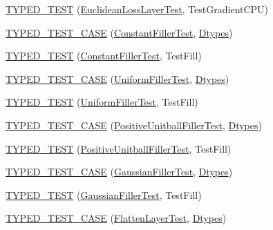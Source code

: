 \begin{DoxyCompactItemize}
\item 
\hyperlink{namespacecaffe_a94529f31fa82dfad9e0ca72b4fddefb7}{T\+Y\+P\+E\+D\+\_\+\+T\+E\+S\+T} (\hyperlink{classcaffe_1_1_euclidean_loss_layer_test}{Euclidean\+Loss\+Layer\+Test}, Test\+Gradient\+C\+P\+U)
\item 
\hyperlink{namespacecaffe_ad6f630503143514a566ea2a6c9ce48ed}{T\+Y\+P\+E\+D\+\_\+\+T\+E\+S\+T\+\_\+\+C\+A\+S\+E} (\hyperlink{classcaffe_1_1_constant_filler_test}{Constant\+Filler\+Test}, \hyperlink{namespacecaffe_a131dc2be50f2f10e18450da61cde6b57}{Dtypes})
\item 
\hyperlink{namespacecaffe_a452ae80d452f583cdb45a02a29f87bb6}{T\+Y\+P\+E\+D\+\_\+\+T\+E\+S\+T} (\hyperlink{classcaffe_1_1_constant_filler_test}{Constant\+Filler\+Test}, Test\+Fill)
\item 
\hyperlink{namespacecaffe_a87d189b64731111d29088c24bf86f88c}{T\+Y\+P\+E\+D\+\_\+\+T\+E\+S\+T\+\_\+\+C\+A\+S\+E} (\hyperlink{classcaffe_1_1_uniform_filler_test}{Uniform\+Filler\+Test}, \hyperlink{namespacecaffe_a131dc2be50f2f10e18450da61cde6b57}{Dtypes})
\item 
\hyperlink{namespacecaffe_a2a9392e41f5b5b00e93d354b20d97b5f}{T\+Y\+P\+E\+D\+\_\+\+T\+E\+S\+T} (\hyperlink{classcaffe_1_1_uniform_filler_test}{Uniform\+Filler\+Test}, Test\+Fill)
\item 
\hyperlink{namespacecaffe_ac4c48ea48c768ad3104fa6ab9dd4f8c4}{T\+Y\+P\+E\+D\+\_\+\+T\+E\+S\+T\+\_\+\+C\+A\+S\+E} (\hyperlink{classcaffe_1_1_positive_unitball_filler_test}{Positive\+Unitball\+Filler\+Test}, \hyperlink{namespacecaffe_a131dc2be50f2f10e18450da61cde6b57}{Dtypes})
\item 
\hyperlink{namespacecaffe_a9b8585aac5fcf3b73d95e40e246cd1b9}{T\+Y\+P\+E\+D\+\_\+\+T\+E\+S\+T} (\hyperlink{classcaffe_1_1_positive_unitball_filler_test}{Positive\+Unitball\+Filler\+Test}, Test\+Fill)
\item 
\hyperlink{namespacecaffe_a4fc7bf007afd3a93cca13d2cc35a33d4}{T\+Y\+P\+E\+D\+\_\+\+T\+E\+S\+T\+\_\+\+C\+A\+S\+E} (\hyperlink{classcaffe_1_1_gaussian_filler_test}{Gaussian\+Filler\+Test}, \hyperlink{namespacecaffe_a131dc2be50f2f10e18450da61cde6b57}{Dtypes})
\item 
\hyperlink{namespacecaffe_aab87332255e1c366cd40ac55c693d909}{T\+Y\+P\+E\+D\+\_\+\+T\+E\+S\+T} (\hyperlink{classcaffe_1_1_gaussian_filler_test}{Gaussian\+Filler\+Test}, Test\+Fill)
\item 
\hyperlink{namespacecaffe_a3c5b4e64a18c9aa8ae58304e42794453}{T\+Y\+P\+E\+D\+\_\+\+T\+E\+S\+T\+\_\+\+C\+A\+S\+E} (\hyperlink{classcaffe_1_1_flatten_layer_test}{Flatten\+Layer\+Test}, \hyperlink{namespacecaffe_a131dc2be50f2f10e18450da61cde6b57}{Dtypes})

\end{DoxyCompactItemize}
